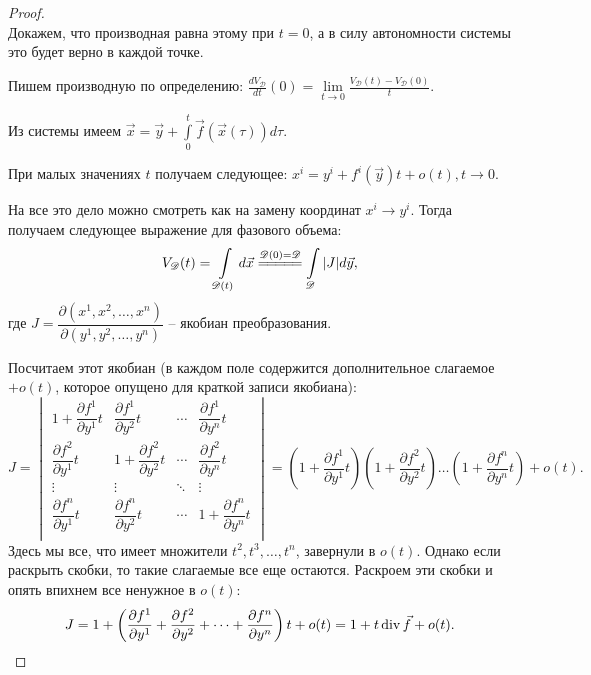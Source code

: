 \begin{proof}
\ \\
Докажем, что производная равна этому при $t = 0$, а в силу автономности системы это будет верно в каждой точке.

Пишем производную по определению: $\displaystyle \frac{dV_\mathscr{D}}{dt}(0) = \lim\limits_{t \rightarrow 0} \frac{V_\mathscr{D}(t) - V_\mathscr{D}(0)}{t}$.

Из системы имеем $\displaystyle \vec{x} = \vec{y} + \int\limits_{0}^t \vec{f}(\vec{x}(\tau))d\tau$.

При малых значениях $t$ получаем следующее: $\displaystyle x^i = y^i + f^i(\vec{y})t + o(t), t\rightarrow 0$.

На все это дело можно смотреть как на замену координат $x^i \longrightarrow y^i$. Тогда получаем следующее выражение для фазового объема:
\begin{equation*}
    V_\mathscr{D}(t) = \int\limits_{\mathscr{D}(t)} d\vec{x} \stackrel{\mathscr{D}(0) = 	\mathscr{D}}{=\joinrel=\joinrel=\joinrel=\joinrel=} \int\limits_{\mathscr{D}} |J| d\vec{y},
\end{equation*}
где $J = \dfrac{\partial (x^1, x^2, \dots, x^n)}{\partial (y^1, y^2, \dots, y^n)}$ -- якобиан преобразования.

Посчитаем этот якобиан (в каждом поле содержится дополнительное слагаемое $+o(t)$, которое опущено для краткой записи якобиана):
\begin{equation*}
    J = \begin{vmatrix}
        1 + \dfrac{\partial f^1}{\partial y^1}t & \dfrac{\partial f^1}{\partial y^2}t & 	\cdots & \dfrac{\partial f^1}{\partial y^n}t \\
        \dfrac{\partial f^2}{\partial y^1}t & 1 + \dfrac{\partial f^2}{\partial y^2}t & 	\cdots & \dfrac{\partial f^2}{\partial y^n}t \\
        \vdots & \vdots & \ddots & \vdots \\
        \dfrac{\partial f^n}{\partial y^1}t & \dfrac{\partial f^n}{\partial y^2}t & 	\cdots & 1 + \dfrac{\partial f^n}{\partial y^n}t \\
    \end{vmatrix} = \left(1 + \dfrac{\partial f^1}{\partial y^1}t\right)\left(1 + 	\dfrac{\partial f^2}{\partial y^2}t\right)\dots\left(1 + \dfrac{\partial f^n}{\partial y^n}t\right) + o(t).
\end{equation*}
Здесь мы все, что имеет множители $t^2, t^3, \dots, t^n$, завернули в $o(t)$. Однако если раскрыть скобки, то такие слагаемые все еще остаются. Раскроем эти скобки и опять впихнем все ненужное в $o(t)$:
\begin{equation*}
    J = 1 + \left(\frac{\partial f^1}{\partial y^1} + \frac{\partial f^2}{\partial y^2} + 	\dots + \frac{\partial f^n}{\partial y^n}\right)t + o(t) = 1 + t\operatorname{div}\vec{f} + o(t).
\end{equation*}


\end{proof}
